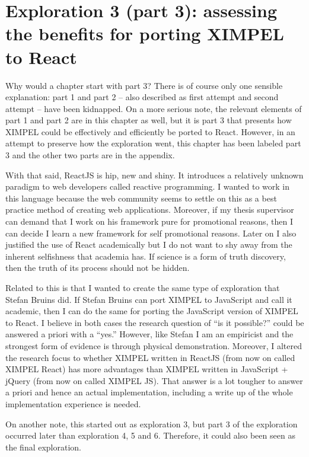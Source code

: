 
\chapter{Exploration 3 (part 3): assessing the benefits for porting XIMPEL to React}
\label{chap:exploration3}

Why would a chapter start with part 3? There is of course only one sensible explanation: part 1 and part 2 -- also described as first attempt and second attempt -- have been kidnapped. On a more serious note, the relevant elements of part 1 and part 2 are in this chapter as well, but it is part 3 that presents how XIMPEL could be effectively and efficiently be ported to React. However, in an attempt to preserve how the exploration went, this chapter has been labeled part 3 and the other two parts are in the appendix.

With that said, ReactJS is hip, new and shiny. It introduces a relatively unknown paradigm to web developers called reactive programming. I wanted to work in this language because the web community seems to settle on this as a best practice method of creating web applications. Moreover, if my thesis supervisor can demand that I work on his framework pure for promotional reasons, then I can decide I learn a new framework for self promotional reasons. Later on I also justified the use of React academically but I do not want to shy away from the inherent selfishness that academia has. If science is a form of truth discovery, then the truth of its process should not be hidden.

Related to this is that I wanted to create the same type of exploration that Stefan Bruins did. If Stefan Bruins can port XIMPEL to JavaScript and call it academic, then I can do the same for porting the JavaScript version of XIMPEL to React. I believe in both cases the research question of ``is it possible?'' could be answered a priori with a ``yes.'' However, like Stefan I am an empiricist and the strongest form of evidence is through physical demonstration. Moreover, I altered the research focus to whether XIMPEL written in ReactJS (from now on called XIMPEL React) has more advantages than XIMPEL written in JavaScript + jQuery (from now on called XIMPEL JS). That answer is a lot tougher to answer a priori and hence an actual implementation, including a write up of the whole implementation experience is needed.

On another note, this started out as exploration 3, but part 3 of the exploration occurred later than exploration 4, 5 and 6. Therefore, it could also been seen as the final exploration. 

